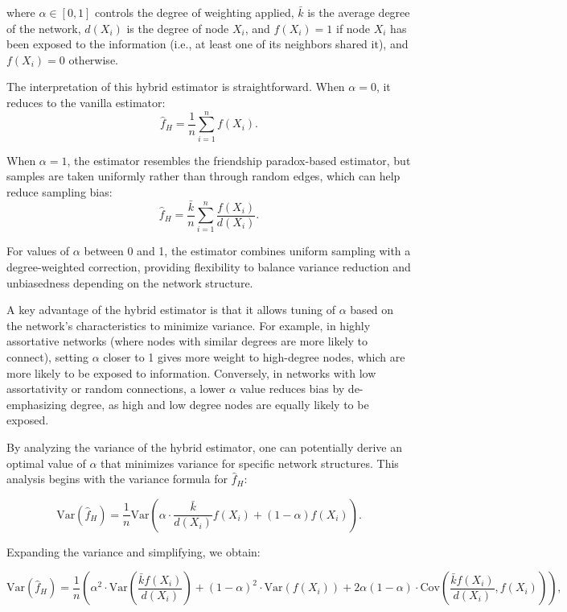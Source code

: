 \documentclass{article}
\begin{document}
\noindent where \( \alpha \in [0, 1] \) controls the degree of weighting applied, \( \bar{k} \) is the average degree of the network, \( d(X_i) \) is the degree of node \( X_i \), and \( f(X_i) = 1 \) if node \( X_i \) has been exposed to the information (i.e., at least one of its neighbors shared it), and \( f(X_i) = 0 \) otherwise.

The interpretation of this hybrid estimator is straightforward. When \( \alpha = 0 \), it reduces to the vanilla estimator:
\[
\hat{f}_H = \frac{1}{n} \sum_{i=1}^n f(X_i).
\]

When \( \alpha = 1 \), the estimator resembles the friendship paradox-based estimator, but samples are taken uniformly rather than through random edges, which can help reduce sampling bias:
\[
\hat{f}_H = \frac{\bar{k}}{n} \sum_{i=1}^n \frac{f(X_i)}{d(X_i)}.
\]

For values of \( \alpha \) between 0 and 1, the estimator combines uniform sampling with a degree-weighted correction, providing flexibility to balance variance reduction and unbiasedness depending on the network structure.

A key advantage of the hybrid estimator is that it allows tuning of \( \alpha \) based on the network's characteristics to minimize variance. For example, in highly assortative networks (where nodes with similar degrees are more likely to connect), setting \( \alpha \) closer to 1 gives more weight to high-degree nodes, which are more likely to be exposed to information. Conversely, in networks with low assortativity or random connections, a lower \( \alpha \) value reduces bias by de-emphasizing degree, as high and low degree nodes are equally likely to be exposed.

By analyzing the variance of the hybrid estimator, one can potentially derive an optimal value of \( \alpha \) that minimizes variance for specific network structures. This analysis begins with the variance formula for \( \hat{f}_H \):

\[
\text{Var}(\hat{f}_H) = \frac{1}{n} \text{Var} \left( \alpha \cdot \frac{\bar{k}}{d(X_i)} f(X_i) + (1 - \alpha) f(X_i) \right).
\]

Expanding the variance and simplifying, we obtain:

\[
\text{Var}(\hat{f}_H) = \frac{1}{n} \left( \alpha^2 \cdot \text{Var} \left( \frac{\bar{k} f(X_i)}{d(X_i)} \right) + (1 - \alpha)^2 \cdot \text{Var}(f(X_i)) + 2 \alpha (1 - \alpha) \cdot \text{Cov} \left( \frac{\bar{k} f(X_i)}{d(X_i)}, f(X_i) \right) \right),
\]
\end{document}
